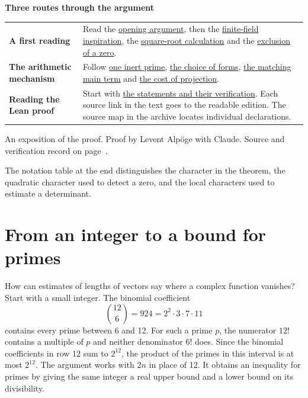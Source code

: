 \documentclass[11pt,letterpaper]{article}
\begin{document}
\bigskip
{\sffamily\bfseries\color{ink}Three routes through the argument}\par
\begin{tabularx}{\linewidth}{@{}p{.235\linewidth}X@{}}
\toprule
\raggedright\arraybackslash\textbf{A first reading} & Read the \hyperref[sec:perspective]{opening argument}, then the \hyperref[sec:discovery]{finite-field inspiration}, the \hyperref[sec:compare]{square-root calculation} and the \hyperref[sec:zero-detection]{exclusion of a zero}.\\[4pt]
\raggedright\arraybackslash\textbf{The arithmetic mechanism} & Follow \hyperref[sec:local-prime]{one inert prime}, \hyperref[sec:good-types]{the choice of forms}, \hyperref[sec:one-lift-lab]{the matching main term} and \hyperref[sec:denominatorlab]{the cost of projection}.\\[4pt]
\raggedright\arraybackslash\textbf{Reading the Lean proof} & Start with \hyperref[sec:record]{the statements and their verification}. Each source link in the text goes to the readable edition. The source map in the archive locates individual declarations.\\
\bottomrule
\end{tabularx}
\vfill
{\small\sffamily\color{quiet}An exposition of the proof. Proof by Levent Alpöge with Claude. Source and verification record on page~\pageref{sec:record}.}\par
\clearpage
\thispagestyle{plain}
\setcounter{tocdepth}{1}
{\small\setlength{\parskip}{0pt}\tableofcontents}
\smallskip
{\small\color{quiet}The notation table at the end distinguishes the character in the theorem, the quadratic character used to detect a zero, and the local characters used to estimate a determinant.}

\clearpage

\section*{From an integer to a bound for primes}
\label{sec:perspective}

How can estimates of lengths of vectors say where a complex function vanishes? Start with a small integer. The binomial coefficient
\[
     \binom{12}{6}=924=2^2\cdot3\cdot7\cdot11
\]
contains every prime between 6 and 12. For such a prime \(p\), the numerator \(12!\) contains a multiple of \(p\) and neither denominator \(6!\) does. Since the binomial coefficients in row 12 sum to \(2^{12}\), the product of the primes in this interval is at most \(2^{12}\). The argument works with \(2n\) in place of 12. It obtains an inequality for primes by giving the same integer a real upper bound and a lower bound on its divisibility.
\end{document}
